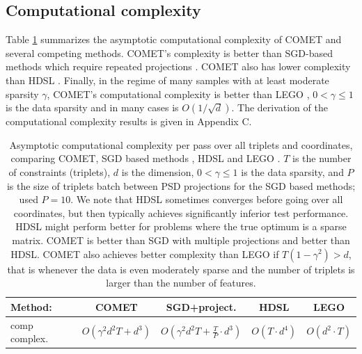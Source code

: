 \documentclass[twoside,11pt]{article}
\begin{document}
\subsection{Computational complexity}

Table \ref{comp-complx} summarizes the asymptotic computational complexity of COMET and several competing methods. COMET's complexity is better than SGD-based methods which require repeated projections \citep{OASIS, qian}. COMET also has lower complexity than HDSL \citep{hdsl}.  Finally, in the regime of many samples with at least moderate sparsity $\gamma$, COMET's computational complexity is better than LEGO \citep{lego}, $0<\gamma \leq 1$ is the data sparsity and in many cases is $O(1/\sqrt{d})$. The derivation of the computational complexity results is given in Appendix C.


\begin{table}[t]
\caption{Asymptotic computational complexity per pass over all triplets and coordinates, comparing COMET, SGD based methods \citep{OASIS, qian}, HDSL \citep{hdsl} and LEGO \citep{lego}. $T$ is the number of constraints (triplets), $d$ is the dimension, $0<\gamma \leq 1$ is the data sparsity, and $P$ is the size of triplets batch between PSD projections for the SGD based methods; \citeauthor{qian} used $P=10$. We note that HDSL sometimes converges before going over all coordinates, but then typically achieves significantly inferior test performance. HDSL might perform better for problems where the true optimum is a sparse matrix. COMET is better than SGD with multiple projections and better than HDSL. COMET also achieves better complexity than LEGO if $T(1-\gamma^2) > d$, that is whenever the data is even moderately sparse and the number of triplets is larger than the number of features.}
\label{comp-complx}
\vskip 0.15in
\begin{center}
\begin{small}
\begin{sc}
\begin{tabular}{lcccc}
\hline
Method: & COMET  & SGD+project.  & HDSL    & LEGO         \\ 
\hline
comp complex. & $O(\gamma^2 d^2 T +  d^3)$&  $O(\gamma^2 d^2 T + \frac{T}{P} \cdot d^3)$
&   $O( T\cdot  d^4)$ &   $O(d^2 \cdot T)$  \\
\hline
\end{tabular}
\end{sc}
\end{small}
\end{center}
\vskip -0.1in
\end{table}
\end{document}
